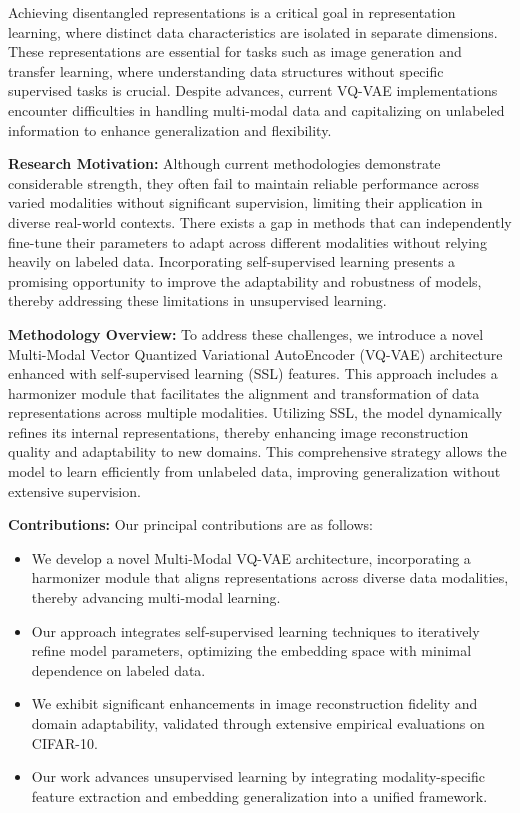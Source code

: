 \documentclass{article} %
\begin{document}
Achieving disentangled representations is a critical goal in representation learning, where distinct data characteristics are isolated in separate dimensions. These representations are essential for tasks such as image generation and transfer learning, where understanding data structures without specific supervised tasks is crucial. Despite advances, current VQ-VAE implementations encounter difficulties in handling multi-modal data and capitalizing on unlabeled information to enhance generalization and flexibility.

\textbf{Research Motivation:} Although current methodologies demonstrate considerable strength, they often fail to maintain reliable performance across varied modalities without significant supervision, limiting their application in diverse real-world contexts. There exists a gap in methods that can independently fine-tune their parameters to adapt across different modalities without relying heavily on labeled data. Incorporating self-supervised learning presents a promising opportunity to improve the adaptability and robustness of models, thereby addressing these limitations in unsupervised learning.

\textbf{Methodology Overview:} To address these challenges, we introduce a novel Multi-Modal Vector Quantized Variational AutoEncoder (VQ-VAE) architecture enhanced with self-supervised learning (SSL) features. This approach includes a harmonizer module that facilitates the alignment and transformation of data representations across multiple modalities. Utilizing SSL, the model dynamically refines its internal representations, thereby enhancing image reconstruction quality and adaptability to new domains. This comprehensive strategy allows the model to learn efficiently from unlabeled data, improving generalization without extensive supervision.

\textbf{Contributions:} Our principal contributions are as follows:
\begin{itemize}
    \item We develop a novel Multi-Modal VQ-VAE architecture, incorporating a harmonizer module that aligns representations across diverse data modalities, thereby advancing multi-modal learning.
    \item Our approach integrates self-supervised learning techniques to iteratively refine model parameters, optimizing the embedding space with minimal dependence on labeled data.
    \item We exhibit significant enhancements in image reconstruction fidelity and domain adaptability, validated through extensive empirical evaluations on CIFAR-10.
    \item Our work advances unsupervised learning by integrating modality-specific feature extraction and embedding generalization into a unified framework.
\end{itemize}
\end{document}
